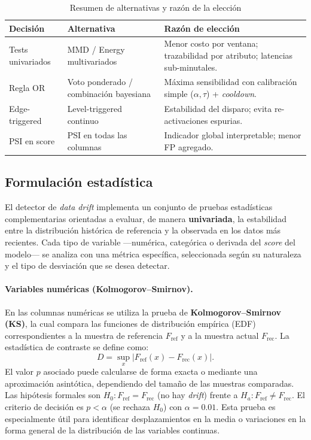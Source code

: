 \begin{table}[H]
\centering
\caption{Resumen de alternativas y razón de la elección}
\label{tab:oe2-alternativas}
\begin{tabular}{p{3.2cm}p{5.1cm}p{5.1cm}}
\toprule
\textbf{Decisión} & \textbf{Alternativa} & \textbf{Razón de elección} \\
\midrule
Tests univariados & MMD / Energy multivariados & Menor costo por ventana; trazabilidad por atributo; latencias sub-minutales. \\
Regla OR & Voto ponderado / combinación bayesiana & Máxima sensibilidad con calibración simple ($\alpha,\tau$) + \emph{cooldown}. \\
Edge-triggered & Level-triggered continuo & Estabilidad del disparo; evita re-activaciones espurias. \\
PSI en score & PSI en todas las columnas & Indicador global interpretable; menor FP agregado. \\
\bottomrule
\end{tabular}
\end{table}


\subsection{Formulación estadística}

El detector de \textit{data drift} implementa un conjunto de pruebas estadísticas complementarias orientadas a evaluar, de manera \textbf{univariada}, la estabilidad entre la distribución histórica de referencia y la observada en los datos más recientes.  
Cada tipo de variable —numérica, categórica o derivada del \textit{score} del modelo— se analiza con una métrica específica, seleccionada según su naturaleza y el tipo de desviación que se desea detectar.

\paragraph{Variables numéricas (Kolmogorov–Smirnov).}  
En las columnas numéricas se utiliza la prueba de \textbf{Kolmogorov–Smirnov (KS)}, la cual compara las funciones de distribución empírica (EDF) correspondientes a la muestra de referencia \(F_{\mathrm{ref}}\) y a la muestra actual \(F_{\mathrm{rec}}\).  
La estadística de contraste se define como:
\[
D = \sup_x |F_{\mathrm{ref}}(x) - F_{\mathrm{rec}}(x)|.
\]
El valor \(p\) asociado puede calcularse de forma exacta o mediante una aproximación asintótica, dependiendo del tamaño de las muestras comparadas.  
Las hipótesis formales son \(H_0: F_{\mathrm{ref}} = F_{\mathrm{rec}}\) (no hay \textit{drift}) frente a \(H_a: F_{\mathrm{ref}} \neq F_{\mathrm{rec}}\).  
El criterio de decisión es \(p < \alpha\) (se rechaza \(H_0\)) con \(\alpha = 0.01\).  
Esta prueba es especialmente útil para identificar desplazamientos en la media o variaciones en la forma general de la distribución de las variables continuas.

